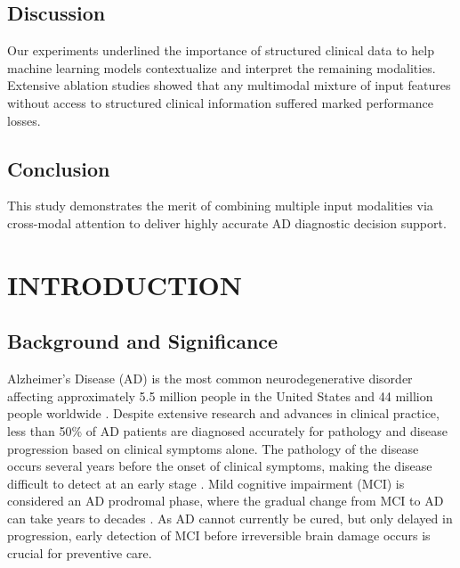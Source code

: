 \documentclass[11pt]{article}
\begin{document}
\subsection*{Discussion}
Our experiments underlined the importance of structured clinical data to help machine learning models contextualize and interpret the remaining modalities. Extensive ablation studies showed that any multimodal mixture of input features without access to structured clinical information suffered marked performance losses.

\subsection*{Conclusion}
This study demonstrates the merit of combining multiple input modalities via cross-modal attention to deliver highly accurate AD diagnostic decision support.



\newpage

\section*{INTRODUCTION}
\subsection*{Background and Significance}

Alzheimer's Disease (AD) is the most common neurodegenerative disorder affecting approximately 5.5 million people in the United States and 44 million people worldwide \cite{naqvi_2017}. Despite extensive research and advances in clinical practice, less than 50\% of AD patients are diagnosed accurately for pathology and disease progression based on clinical symptoms alone\cite{thies_bleiler_2013}. The pathology of the disease occurs several years before the onset of clinical symptoms, making the disease difficult to detect at an early stage \cite{iddi_li_aisen_rafii_thompson_donohue_2019}. Mild cognitive impairment (MCI) is considered an AD prodromal phase, where the gradual change from MCI to AD can take years to decades \cite{petersen_2016}. As AD cannot currently be cured, but only delayed in progression, early detection of MCI before irreversible brain damage occurs is crucial for preventive care. 
\end{document}
